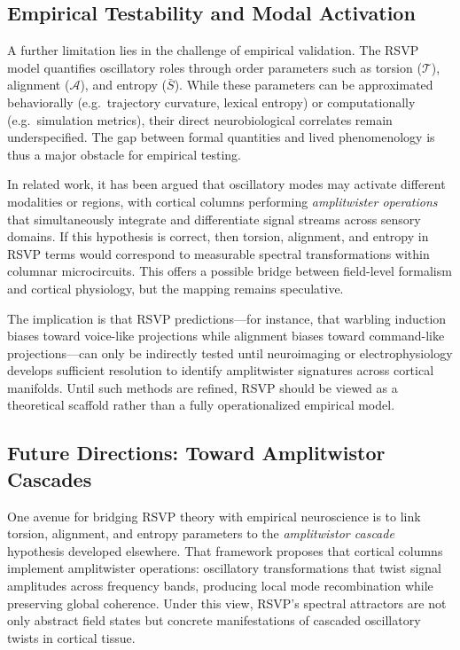 \documentclass[a4paper,11pt]{article}
\begin{document}
\subsection{Empirical Testability and Modal Activation}
A further limitation lies in the challenge of empirical validation. The RSVP
model quantifies oscillatory roles through order parameters such as torsion
($\mathcal{T}$), alignment ($\mathcal{A}$), and entropy ($\bar{S}$). While
these parameters can be approximated behaviorally (e.g.\ trajectory curvature,
lexical entropy) or computationally (e.g.\ simulation metrics), their direct
neurobiological correlates remain underspecified. The gap between formal
quantities and lived phenomenology is thus a major obstacle for empirical
testing.

In related work, it has been argued that oscillatory modes may activate
different modalities or regions, with cortical columns performing
\emph{amplitwister operations} that simultaneously integrate and differentiate
signal streams across sensory domains. If this hypothesis is correct, then
torsion, alignment, and entropy in RSVP terms would correspond to measurable
spectral transformations within columnar microcircuits. This offers a possible
bridge between field-level formalism and cortical physiology, but the mapping
remains speculative.

The implication is that RSVP predictions---for instance, that warbling induction
biases toward voice-like projections while alignment biases toward
command-like projections---can only be indirectly tested until neuroimaging or
electrophysiology develops sufficient resolution to identify amplitwister
signatures across cortical manifolds. Until such methods are refined, RSVP
should be viewed as a theoretical scaffold rather than a fully operationalized
empirical model.

\subsection{Future Directions: Toward Amplitwistor Cascades}
One avenue for bridging RSVP theory with empirical neuroscience is to link
torsion, alignment, and entropy parameters to the \emph{amplitwistor cascade}
hypothesis developed elsewhere. That framework proposes that cortical columns
implement amplitwister operations: oscillatory transformations that twist signal
amplitudes across frequency bands, producing local mode recombination while
preserving global coherence. Under this view, RSVP’s spectral attractors are not
only abstract field states but concrete manifestations of cascaded oscillatory
twists in cortical tissue.
\end{document}
